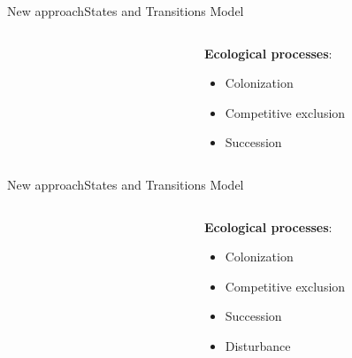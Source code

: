 \documentclass[10pt,aspectratio=149]{beamer}
\begin{document}

\begin{frame}{New approach}{States and Transitions Model}


\begin{columns}[t]
	\begin{column}[t]{.40\paperwidth}
		\begin{figure}
			\small{}
		\end{figure}
	\end{column}
	\begin{column}[t]{.50\paperwidth}
	\textbf{Ecological processes}:
	\begin{itemize}
		\item Colonization
		\item Competitive exclusion
		\item Succession
	\end{itemize}
	\end{column}
\end{columns}

\end{frame}


\begin{frame}{New approach}{States and Transitions Model}


\begin{columns}[t]
	\begin{column}[t]{.40\paperwidth}
		\begin{figure}
			\small{}
		\end{figure}
	\end{column}
	\begin{column}[t]{.50\paperwidth}
	\textbf{Ecological processes}:
	\begin{itemize}
		\item Colonization
		\item Competitive exclusion
		\item Succession
		\item Disturbance
	\end{itemize}
	\end{column}
\end{columns}

\end{frame}
\end{document}
